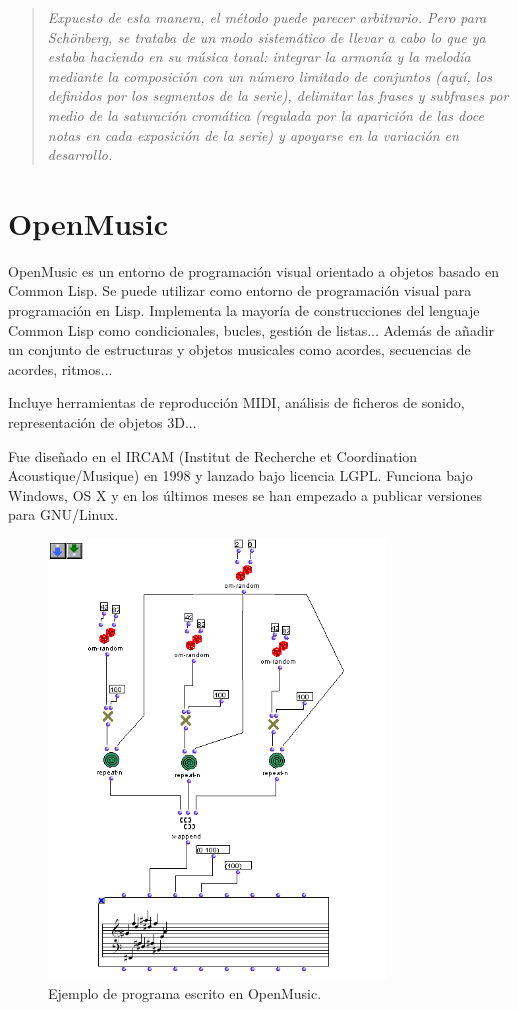 \documentclass[a4paper,openright,12pt]{book}
\begin{document}
\begin{quote}
\em Expuesto de esta manera, el método puede parecer arbitrario. Pero para Schönberg, se trataba de un modo sistemático de llevar a cabo lo que ya estaba haciendo en su música tonal: integrar la armonía y la melodía mediante la composición con un número limitado de conjuntos (aquí, los definidos por los segmentos de la serie), delimitar las frases y subfrases por medio de la saturación cromática (regulada por la aparición de las doce notas en cada exposición de la serie) y apoyarse en la variación en desarrollo. \cite{palisca}
\end{quote}

\section{OpenMusic}
OpenMusic \cite{openmusic} es un entorno de programación visual orientado a objetos basado en Common Lisp. Se puede utilizar como entorno de programación visual para programación en Lisp. Implementa la mayoría de construcciones del lenguaje Common Lisp como condicionales, bucles, gestión de listas... Además de añadir un conjunto de estructuras y objetos musicales como acordes, secuencias de acordes, ritmos...

Incluye herramientas de reproducción MIDI, análisis de ficheros de sonido, representación de objetos 3D...

Fue diseñado en el IRCAM (Institut de Recherche et Coordination Acoustique/Musique) en 1998 y lanzado bajo licencia LGPL. Funciona bajo Windows, OS X y en los últimos meses se han empezado a publicar versiones para GNU/Linux.

\begin{figure}
\centering
\includegraphics[width=0.8\textwidth]{img/Om_patch.png} 
\caption{Ejemplo de programa escrito en OpenMusic. \cite{wiki:openmusic}} \label{fig:openmusic}
\end{figure}
\end{document}
